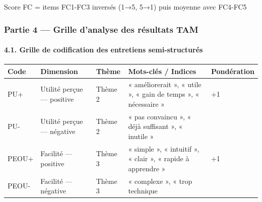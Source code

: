 \documentclass[
  12pt,
]{article}
\newcounter{none} %
\begin{document}
Score FC = items FC1-FC3 inversés (1→5, 5→1) puis moyenne avec FC4-FC5

\subsubsection{Partie 4 — Grille d’analyse des résultats
TAM}\label{partie-4-grille-danalyse-des-ruxe9sultats-tam}

\paragraph{4.1. Grille de codification des entretiens
semi-structurés}\label{grille-de-codification-des-entretiens-semi-structuruxe9s}

{\def\LTcaptype{none} %
\begin{longtable}[]{@{}
  >{\raggedright\arraybackslash}p{}
  >{\raggedright\arraybackslash}p{}
  >{\raggedright\arraybackslash}p{}
  >{\raggedright\arraybackslash}p{}
  >{\raggedright\arraybackslash}p{}@{}}
\toprule\noalign{}
\begin{minipage}[b]{\linewidth}\raggedright
Code
\end{minipage} & \begin{minipage}[b]{\linewidth}\raggedright
Dimension
\end{minipage} & \begin{minipage}[b]{\linewidth}\raggedright
Thème
\end{minipage} & \begin{minipage}[b]{\linewidth}\raggedright
Mots-clés / Indices
\end{minipage} & \begin{minipage}[b]{\linewidth}\raggedright
Pondération
\end{minipage} \\
\midrule\noalign{}
\endhead
\bottomrule\noalign{}
\endlastfoot
PU+ & Utilité perçue — positive & Thème 2 & « améliorerait », « utile »,
« gain de temps », « nécessaire » & +1 \\
PU- & Utilité perçue — négative & Thème 2 & « pas convaincu », « déjà
suffisant », « inutile » & -1 \\
PEOU+ & Facilité — positive & Thème 3 & « simple », « intuitif », «
clair », « rapide à apprendre » & +1 \\
PEOU- & Facilité — négative & Thème 3 & « complexe », « trop technique

\end{longtable}}
\end{document}

